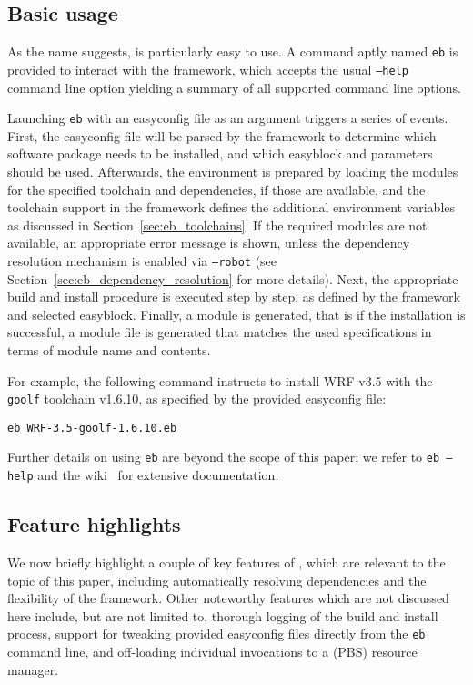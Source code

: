 \subsection{Basic usage}

As the name suggests, \easybuild{} is particularly easy to use. A command aptly named
\texttt{eb} is provided to interact with the \easybuild{} framework, which accepts
the usual \texttt{--help} command line option yielding a summary of all supported
command line options.

Launching \texttt{eb} with an easyconfig file as an argument triggers a
series of events. First, the easyconfig file will be parsed by the \easybuild{}
framework to determine which software package needs to be installed, and which
easyblock and parameters should be used. Afterwards, the environment is prepared by
loading the modules for the specified toolchain and dependencies, if those are
available, and the toolchain support in the framework defines the additional
environment variables as discussed in Section~\ref{sec:eb_toolchains}. If the
required modules are not available, an appropriate error message is shown, unless
the dependency resolution mechanism is enabled via \texttt{--robot} (see
Section~\ref{sec:eb_dependency_resolution} for more details). Next,
the appropriate build and install procedure is executed step by step, as defined by
the framework and selected easyblock. Finally, a module is generated, that is if the
installation is successful, a module file is generated that matches the used
specifications in terms of module name and contents.

For example, the following command instructs \easybuild{} to install WRF v3.5
with the \texttt{goolf} toolchain v1.6.10, as specified by the provided easyconfig
file:

\texttt{eb WRF-3.5-goolf-1.6.10.eb}

Further details on using \texttt{eb} are beyond the scope of this paper; we refer
to \texttt{eb --help} and the \easybuild{} wiki~\cite{ebwiki} for extensive
documentation.

\subsection{Feature highlights}
\label{sec:eb_features}

We now briefly highlight a couple of key features of \easybuild{}, which are relevant
to the topic of this paper, including automatically resolving dependencies and
the flexibility of the \easybuild{} framework. Other noteworthy features which are
not discussed here include, but are not limited to, thorough logging of the build
and install process, support for tweaking provided easyconfig files directly from
the \texttt{eb} command line, and off-loading individual \easybuild{} invocations to
a (PBS) resource manager.

